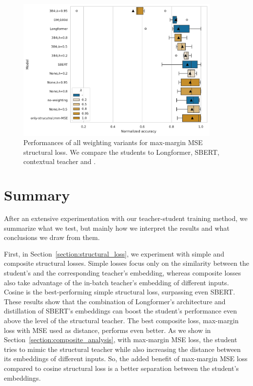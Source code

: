 \begin{figure}

  \includegraphics[width=0.9\textwidth]{img/mm_mse_weighting.pdf}

  \caption{Performances of all weighting variants for max-margin MSE
  structural loss. We compare the students to Longformer, SBERT,
   contextual teacher and .}

  \label{fig:mm_mse_weighting}

\end{figure}

\section{Summary}\label{section:experiments_summary}

After an extensive experimentation with our teacher-student training method, we
summarize what we test, but mainly how we interpret the results and what
conclusions we draw from them.

First, in Section~\ref{section:structural_loss}, we experiment with simple and
composite structural losses. Simple losses focus only on the similarity
between the student's and the corresponding teacher's embedding, whereas composite
losses also take advantage of the in-batch teacher's embedding of different
inputs. Cosine is the best-performing simple structural loss, surpassing even
SBERT. These results show that the combination of Longformer's architecture and
distillation of SBERT's embeddings can boost the student's performance even
above the level of the structural teacher. The best composite loss, max-margin loss with MSE used as distance, performs even better. As we show in
Section~\ref{section:composite_analysis}, with max-margin MSE loss, the student
tries to mimic the structural teacher while also increasing the distance
between its embeddings of different inputs. So, the added benefit of max-margin MSE loss compared to
cosine structural loss is a better separation between the student's embeddings.

